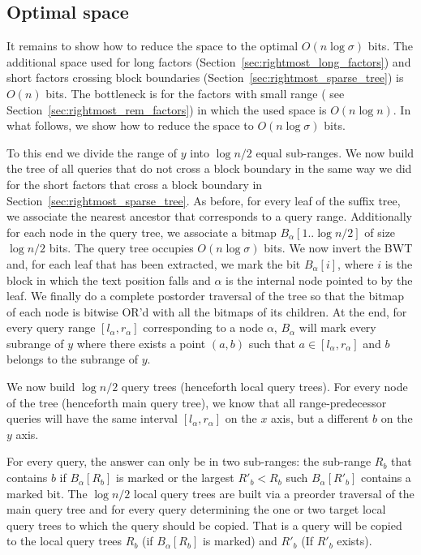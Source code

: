 \documentclass[11pt,runningheads]{llncs}
\begin{document}
\subsection{Optimal space}
\label{sec:opt_space_rightmost}
It remains to show how to reduce the space to the optimal $O(n\log\sigma)$ bits. 
The additional space used for long factors (Section~\ref{sec:rightmost_long_factors}) 
and short factors crossing block boundaries (Section~\ref{sec:rightmost_sparse_tree}) 
is $O(n)$ bits. The bottleneck is for the factors with small range (
see Section~\ref{sec:rightmost_rem_factors}) in which the used space is 
$O(n\log n)$. In what follows, we show how to reduce the space to $O(n\log\sigma)$
bits. 

To this end we divide the range of $y$ into $\log n/2$ equal sub-ranges. 
We now build the tree of all queries that do not cross 
a block boundary in the same way we did for the short factors that cross a block boundary
in Section~\ref{sec:rightmost_sparse_tree}. 
As before, for every leaf of the suffix tree, 
we associate the nearest ancestor that corresponds to a query range. Additionally for each node 
in the query tree, we associate a bitmap $B_\alpha[1..\log n/2]$ of size $\log n/2$ bits. The 
query tree occupies $O(n\log\sigma)$ bits. We now invert the BWT and, for each leaf that has 
been extracted, we mark the bit $B_\alpha[i]$, where $i$ is the block in which the text position 
falls and $\alpha$ is the internal node pointed to by the leaf. We finally do a complete postorder 
traversal of the tree so that the bitmap of each node is bitwise OR'd with all the bitmaps of its 
children. At the end, for every query range $[l_\alpha,r_\alpha]$ corresponding to a node $\alpha$, 
$B_\alpha$ will mark every subrange of $y$ where there exists a point $(a,b)$ such that 
$a\in [l_\alpha,r_\alpha]$ and $b$ belongs to the subrange of $y$. 

We now build $\log n/2$ query trees (henceforth local query trees). For every node of the tree
(henceforth main query tree), 
we know that all range-predecessor queries will have the same interval 
$[l_\alpha,r_\alpha]$ on the $x$ axis, but a different $b$ on the $y$ axis. 

For every query, the answer can only be in two sub-ranges: the sub-range 
$R_b$ that contains $b$ if $B_\alpha[R_b]$ is marked  
or the largest $R'_b<R_b$ such $B_\alpha[R'_b]$ contains a marked bit. 
The $\log n/2$ local query trees are built via a preorder traversal 
of the main query tree and for every query determining the one or two 
target local query trees to which the query should be copied. 
That is a query will be copied to the local query trees $R_b$ 
(if $B_\alpha[R_b]$ is marked) and $R'_b$ (If $R'_b$ exists). 
\end{document}
